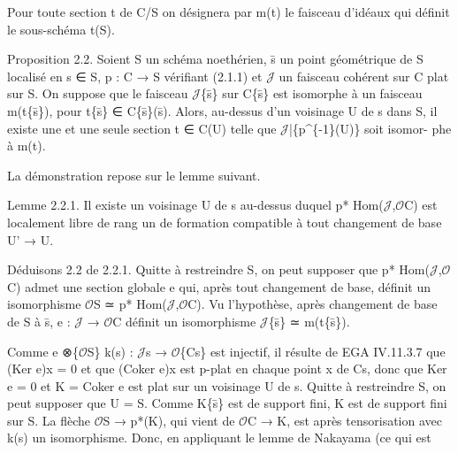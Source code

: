 \documentclass[11pt,a4paper]{article}
\begin{document}
Pour toute section t de C/S on désignera par m(t) le faisceau d'idéaux qui définit le sous-schéma t(S).

Proposition 2.2. Soient S un schéma noethérien, s̄ un point géométrique de S localisé en s ∈ S, p : C → S vérifiant (2.1.1) et \ensuremath{\mathcal{J}} un faisceau cohérent sur C plat sur S. On suppose que le faisceau \ensuremath{\mathcal{J}}\textunderscore{}\{s̄\} sur C\textunderscore{}\{s̄\} est isomorphe à un faisceau m(t\textunderscore{}\{s̄\}), pour t\textunderscore{}\{s̄\} ∈ C\textunderscore{}\{s̄\}(s̄). Alors, au-dessus d'un voisinage U de s dans S, il existe une et une seule section t ∈ C(U) telle que \ensuremath{\mathcal{J}}|\textunderscore{}\{p\textasciicircum{}\{-1\}(U)\} soit isomor- phe à m(t).

La démonstration repose sur le lemme suivant.

Lemme 2.2.1. Il existe un voisinage U de s au-dessus duquel p\textunderscore{}* Hom(\ensuremath{\mathcal{J}},\ensuremath{\mathcal{O}}\textunderscore{}C) est localement libre de rang un de formation compatible à tout changement de base U' → U.

Déduisons 2.2 de 2.2.1. Quitte à restreindre S, on peut supposer que p\textunderscore{}* Hom(\ensuremath{\mathcal{J}},\ensuremath{\mathcal{O}}\textunderscore{}C) admet une section globale e qui, après tout changement de base, définit un isomorphisme \ensuremath{\mathcal{O}}\textunderscore{}S ≃ p\textunderscore{}* Hom(\ensuremath{\mathcal{J}},\ensuremath{\mathcal{O}}\textunderscore{}C). Vu l'hypothèse, après changement de base de S à s̄, e : \ensuremath{\mathcal{J}} → \ensuremath{\mathcal{O}}\textunderscore{}C définit un isomorphisme \ensuremath{\mathcal{J}}\textunderscore{}\{s̄\} ≃ m(t\textunderscore{}\{s̄\}).

Comme e ⊗\textunderscore{}\{\ensuremath{\mathcal{O}}\textunderscore{}S\} k(s) : \ensuremath{\mathcal{J}}\textunderscore{}s → \ensuremath{\mathcal{O}}\textunderscore{}\{C\textunderscore{}s\} est injectif, il résulte de EGA IV.11.3.7 que (Ker e)\textunderscore{}x = 0 et que (Coker e)\textunderscore{}x est p-plat en chaque point x de C\textunderscore{}s, donc que Ker e = 0 et K = Coker e est plat sur un voisinage U de s. Quitte à restreindre S, on peut supposer que U = S. Comme K\textunderscore{}\{s̄\} est de support fini, K est de support fini sur S. La flèche \ensuremath{\mathcal{O}}\textunderscore{}S → p\textunderscore{}*(K), qui vient de \ensuremath{\mathcal{O}}\textunderscore{}C → K, est après tensorisation avec k(s) un isomorphisme. Donc, en appliquant le lemme de Nakayama (ce qui est
\end{document}
